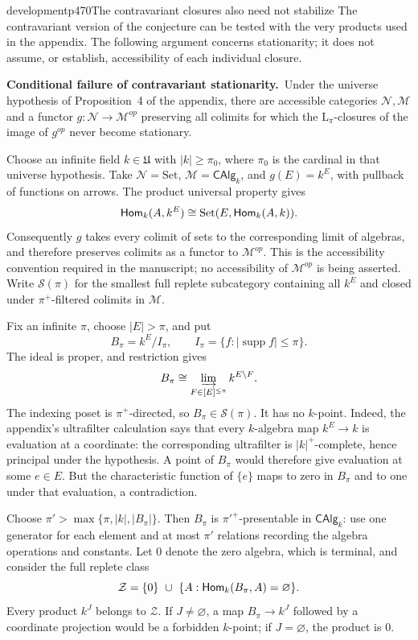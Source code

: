\begin{dcomment}{development}{p470}{The contravariant closures also need not stabilize}
The contravariant version of the conjecture can be tested with the very products used in the appendix. The following argument concerns stationarity; it does not assume, or establish, accessibility of each individual closure.

\textbf{Conditional failure of contravariant stationarity.}\ours\
Under the universe hypothesis of Proposition~4 of the appendix, there are accessible categories $\mathcal N,\mathcal M$ and a functor $g:\mathcal N\to\mathcal M^{op}$ preserving all colimits for which the $\mathrm L_\pi$-closures of the image of $g^{op}$ never become stationary.

Choose an infinite field $k\in\mathfrak U$ with $|k|\ge\pi_0$, where $\pi_0$ is the cardinal in that universe hypothesis. Take $\mathcal N=\mathrm{Set}$, $\mathcal M=\mathsf{CAlg}_k$, and $g(E)=k^E$, with pullback of functions on arrows. The product universal property gives
\[
 \mathsf{Hom}_k(A,k^E)\cong\mathrm{Set}(E,\mathsf{Hom}_k(A,k)).
\]
Consequently $g$ takes every colimit of sets to the corresponding limit of algebras, and therefore preserves colimits as a functor to $\mathcal M^{op}$. This is the accessibility convention required in the manuscript; no accessibility of $\mathcal M^{op}$ is being asserted. Write $\mathcal S(\pi)$ for the smallest full replete subcategory containing all $k^E$ and closed under $\pi^+$-filtered colimits in $\mathcal M$.

Fix an infinite $\pi$, choose $|E|>\pi$, and put
\[
 B_\pi= k^E/I_\pi,
 \qquad I_\pi=\{f:|\operatorname{supp}f|\le\pi\}.
\]
The ideal is proper, and restriction gives
\[
 B_\pi\cong\varinjlim_{F\in[E]^{\le\pi}} k^{E\setminus F}.
\]
The indexing poset is $\pi^+$-directed, so $B_\pi\in\mathcal S(\pi)$. It has no $k$-point. Indeed, the appendix's ultrafilter calculation says that every $k$-algebra map $k^E\to k$ is evaluation at a coordinate: the corresponding ultrafilter is $|k|^+$-complete, hence principal under the hypothesis. A point of $B_\pi$ would therefore give evaluation at some $e\in E$. But the characteristic function of $\{e\}$ maps to zero in $B_\pi$ and to one under that evaluation, a contradiction.

Choose $\pi'>\max\{\pi,|k|,|B_\pi|\}$. Then $B_\pi$ is $\pi'^+$-presentable in $\mathsf{CAlg}_k$: use one generator for each element and at most $\pi'$ relations recording the algebra operations and constants. Let $0$ denote the zero algebra, which is terminal, and consider the full replete class
\[
 \mathcal Z=\{0\}\ \cup\
 \{A:\mathsf{Hom}_k(B_\pi,A)=\varnothing\}.
\]
Every product $k^J$ belongs to $\mathcal Z$. If $J\ne\varnothing$, a map $B_\pi\to k^J$ followed by a coordinate projection would be a forbidden $k$-point; if $J=\varnothing$, the product is $0$.


\end{dcomment}
